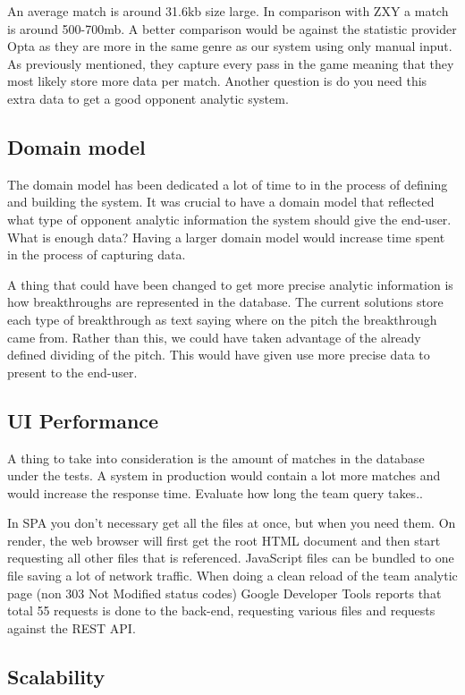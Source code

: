 An average match is around 31.6kb size large. In comparison with ZXY a match is around 500-700mb. A better comparison would be against the statistic provider Opta as they are more in the same genre as our system using only manual input. As previously mentioned, they capture every pass in the game meaning that they most likely store more data per match. Another question is do you need this extra data to get a good opponent analytic system.

\subsection{Domain model}
The domain model has been dedicated a lot of time to in the process of defining and building the system. It was crucial to have a domain model that reflected what type of opponent analytic information the system should give the end-user. What is enough data? Having a larger domain model would increase time spent in the process of capturing data. 

A thing that could have been changed to get more precise analytic information is how breakthroughs are represented in the database. The current solutions store each type of breakthrough as text saying where on the pitch the breakthrough came from. Rather than this, we could have taken advantage of the already defined dividing of the pitch. This would have given use more precise data to present to the end-user.

\subsection{UI Performance}

A thing to take into consideration is the amount of matches in the database under the tests. A system in production would contain a lot more matches and would increase the response time. Evaluate how long the team query takes..

In \ac{SPA} you don't necessary get all the files at once, but when you need them. On render, the web browser will first get the root \ac{HTML} document and then start requesting all other files that is referenced. JavaScript files can be bundled to one file saving a lot of network traffic. When doing a clean reload of the team analytic page (non 303 Not Modified status codes) Google Developer Tools reports that total 55 requests is done to the back-end, requesting various files and requests against the \ac{REST} \ac{API}.


\subsection{Scalability}

